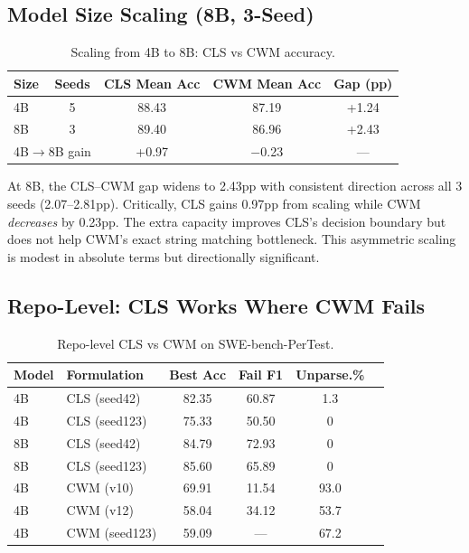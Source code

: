 \documentclass[11pt,a4paper]{article}
\begin{document}
\subsection{Model Size Scaling (8B, 3-Seed)}
\label{sec:scaling}

\begin{table}[h]
\centering
\caption{Scaling from 4B to 8B: CLS vs CWM accuracy.}
\label{tab:8b}
\begin{tabular}{lcccc}
\toprule
Size & Seeds & CLS Mean Acc & CWM Mean Acc & Gap (pp) \\
\midrule
4B & 5 & 88.43 & 87.19 & +1.24 \\
8B & 3 & 89.40 & 86.96 & +2.43 \\
\midrule
\multicolumn{2}{l}{4B$\to$8B gain} & +0.97 & $-$0.23 & --- \\
\bottomrule
\end{tabular}
\end{table}

At 8B, the CLS--CWM gap widens to 2.43pp with consistent direction across all 3 seeds (2.07--2.81pp). Critically, CLS gains 0.97pp from scaling while CWM \emph{decreases} by 0.23pp. The extra capacity improves CLS's decision boundary but does not help CWM's exact string matching bottleneck. This asymmetric scaling is modest in absolute terms but directionally significant.

\subsection{Repo-Level: CLS Works Where CWM Fails}
\label{sec:repo}

\begin{table}[h]
\centering
\caption{Repo-level CLS vs CWM on SWE-bench-PerTest.}
\label{tab:repo}
\begin{tabular}{llcccc}
\toprule
Model & Formulation & Best Acc & Fail F1 & Unparse.\% \\
\midrule
4B & CLS (seed42) & 82.35 & 60.87 & 1.3 \\
4B & CLS (seed123) & 75.33 & 50.50 & 0 \\
8B & CLS (seed42) & 84.79 & 72.93 & 0 \\
8B & CLS (seed123) & 85.60 & 65.89 & 0 \\
\midrule
4B & CWM (v10) & 69.91 & 11.54 & 93.0 \\
4B & CWM (v12) & 58.04 & 34.12 & 53.7 \\
4B & CWM (seed123) & 59.09 & --- & 67.2 \\
\bottomrule
\end{tabular}
\end{table}
\end{document}
